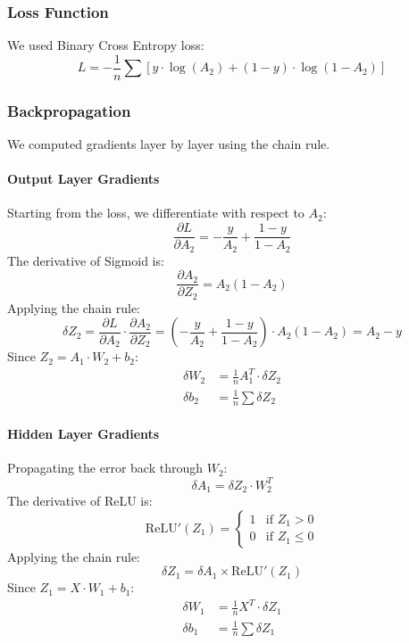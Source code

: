 \documentclass[sigconf]{acmart}
\begin{document}
\subsubsection{Loss Function}
We used Binary Cross Entropy loss:
\begin{equation}
L = -\frac{1}{n} \sum \left[ y \cdot \log(A_2) + (1 - y) \cdot \log(1 - A_2) \right]
\end{equation}

\subsubsection{Backpropagation}
We computed gradients layer by layer using the chain rule.

\paragraph{Output Layer Gradients}
Starting from the loss, we differentiate with respect to $A_2$:
\begin{equation}
\frac{\partial L}{\partial A_2} = -\frac{y}{A_2} + \frac{1 - y}{1 - A_2}
\end{equation}
The derivative of Sigmoid is:
\begin{equation}
\frac{\partial A_2}{\partial Z_2} = A_2(1 - A_2)
\end{equation}
Applying the chain rule:
\begin{equation}
\delta Z_2 = \frac{\partial L}{\partial A_2} \cdot \frac{\partial A_2}{\partial Z_2} = \left( -\frac{y}{A_2} + \frac{1 - y}{1 - A_2} \right) \cdot A_2(1 - A_2) = A_2 - y
\end{equation}
Since $Z_2 = A_1 \cdot W_2 + b_2$:
\begin{align}
\delta W_2 &= \frac{1}{n} A_1^T \cdot \delta Z_2 \\
\delta b_2 &= \frac{1}{n} \sum \delta Z_2
\end{align}

\paragraph{Hidden Layer Gradients}
Propagating the error back through $W_2$:
\begin{equation}
\delta A_1 = \delta Z_2 \cdot W_2^T
\end{equation}
The derivative of ReLU is:
\begin{equation}
\text{ReLU}'(Z_1) =
\begin{cases}
1 & \text{if } Z_1 > 0 \\
0 & \text{if } Z_1 \leq 0
\end{cases}
\end{equation}
Applying the chain rule:
\begin{equation}
\delta Z_1 = \delta A_1 \times \text{ReLU}'(Z_1)
\end{equation}
Since $Z_1 = X \cdot W_1 + b_1$:
\begin{align}
\delta W_1 &= \frac{1}{n} X^T \cdot \delta Z_1 \\
\delta b_1 &= \frac{1}{n} \sum \delta Z_1
\end{align}
\end{document}
